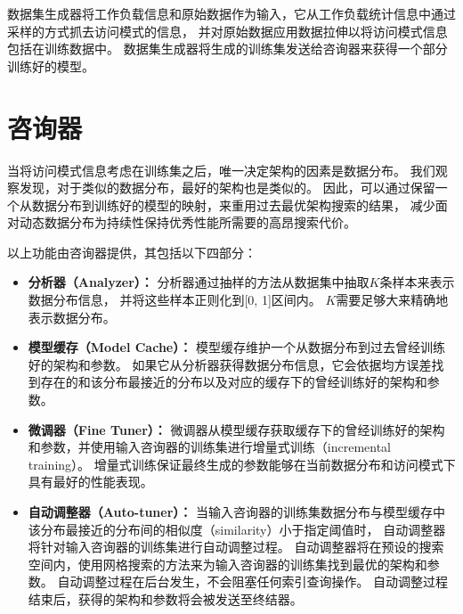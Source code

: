 数据集生成器将工作负载信息和原始数据作为输入，它从工作负载统计信息中通过采样的方式抓去访问模式的信息，
并对原始数据应用数据拉伸以将访问模式信息包括在训练数据中。
数据集生成器将生成的训练集发送给咨询器来获得一个部分训练好的模型。


\section{咨询器}

当将访问模式信息考虑在训练集之后，唯一决定{\li}架构的因素是数据分布。
我们观察发现，对于类似的数据分布，最好的{\li}架构也是类似的。
因此，{\sys}可以通过保留一个从数据分布到训练好的模型的映射，来重用过去最优{\li}架构搜索的结果，
减少面对动态数据分布为持续性保持{\li}优秀性能所需要的高昂搜索代价。


以上功能由咨询器提供，其包括以下四部分：
\begin{itemize}
  \item
    \textbf{分析器（Analyzer）：}
    分析器通过抽样的方法从数据集中抽取$K$条样本来表示数据分布信息，
    并将这些样本正则化到[0, 1]区间内。
    $K$需要足够大来精确地表示数据分布。
  \item
    \textbf{模型缓存（Model Cache）：}
    模型缓存维护一个从数据分布到过去曾经训练好的{\li}架构和参数。
    如果它从分析器获得数据分布信息，它会依据均方误差找到存在的和该分布最接近的分布以及对应的缓存下的曾经训练好的{\li}架构和参数。
  \item
    \textbf{微调器（Fine Tuner）：}
    微调器从模型缓存获取缓存下的曾经训练好的{\li}架构和参数，并使用输入咨询器的训练集进行增量式训练（incremental training）。
    增量式训练保证最终生成的{\li}参数能够在当前数据分布和访问模式下具有最好的性能表现。
  \item
    \textbf{自动调整器（Auto-tuner）：}
    当输入咨询器的训练集数据分布与模型缓存中该分布最接近的分布间的相似度（similarity）小于指定阈值时，
    自动调整器将针对输入咨询器的训练集进行自动调整过程。
    自动调整器将在预设的搜索空间内，使用网格搜索的方法来为输入咨询器的训练集找到最优的{\li}架构和参数。
    自动调整过程在后台发生，不会阻塞任何索引查询操作。
    自动调整过程结束后，获得的{\li}架构和参数将会被发送至终结器。
\end{itemize}

